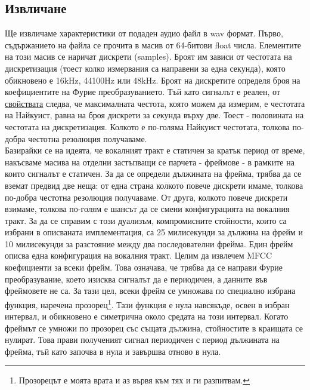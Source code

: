 \documentclass[main.tex]{subfiles}
\begin{document}
    \subsection{Извличане}
    Ще извличаме характеристики от подаден аудио файл в wav формат. Първо, съдържанието на файла се прочита в масив от 64-битови float числа. Елементите на този масив се наричат дискрети (samples). Броят им зависи от честотата на дискретизация (тоест колко измервания са направени за една секунда), която обикновено е 16kHz, 44100Hz или 48kHz. Броят на дискретите определя броя на коефициентите на Фурие преобразуванието. Тъй като сигналът е реален, от \hyperref[appendix:fourier:property]{свойствата} следва, че максималната честота, която можем да измерим, е честотата на Найкуист, равна на броя дискрети за секунда върху две. Тоест - половината на честотата на дискретизация.
    Колкото е по-голяма Найкуист честотата, толкова по-добра честотна резолюция получаваме.\\
    Базирайки се на идеята, че вокалният тракт е статичен за кратък период от време, накъсваме масива на отделни застъпващи се парчета - фреймове - в рамките на които сигналът е статичен. За да се определи дължината на фрейма, трябва да се вземат предвид две неща: от една страна колкото повече дискрети имаме, толкова по-добра честотна резолюция получаваме. От друга, колкото повече дискрети взимаме, толкова по-голям е шансът да се смени конфигурацията на вокалния тракт. За да се справим с този дуализъм, компромисните стойности, които са избрани в описваната имплементация, са 25 милисекунди за дължина на фрейм и 10 милисекунди за разстояние между два последователни фрейма. Един фрейм описва една конфигурация на вокалния тракт.
    Целим да извлечем MFCC коефициенти за всеки фрейм. Това означава, че трябва да се направи Фурие преобразувание, което изисква сигналът да е периодичен, а данните във фреймовете не са. За тази цел, всеки фрейм се умножава по специално избрана функция, наречена прозорец\footnote{Прозорецът е моята врата и аз вървя към тях и ги разпитвам.}. Тази функция е нула навсякъде, освен в избран интервал, и обикновено е симетрична около средата на този интервал. Когато фреймът се умножи по прозорец със същата дължина, стойностите в краищата се нулират. Това прави полученият сигнал периодичен с период дължината на фрейма, тъй като започва в нула и завършва отново в нула.
    
\end{document}
